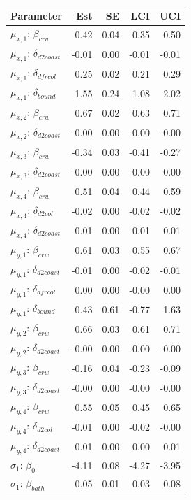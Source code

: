 \documentclass{rgclass}
\begin{document}
\begin{longtable}{@{}lrrrr@{}}
\toprule
Parameter & Est & SE & LCI & UCI \\
\bottomrule
$\mu_{x,1}$: $\beta_{crw}$ & 0.42 & 0.04 & 0.35 & 0.50 \\
$\mu_{x,1}$: $\delta_{d2coast}$ & -0.01 & 0.00 & -0.01 & -0.01 \\
$\mu_{x,1}$: $\delta_{dfrcol}$ & 0.25 & 0.02 & 0.21 & 0.29 \\
$\mu_{x,1}$: $\delta_{bound}$ & 1.55 & 0.24 & 1.08 & 2.02 \\
\hdashline
$\mu_{x,2}$: $\beta_{crw}$ & 0.67 & 0.02 & 0.63 & 0.71 \\
$\mu_{x,2}$: $\delta_{d2coast}$ & -0.00 & 0.00 & -0.00 & -0.00 \\
\hdashline
$\mu_{x,3}$: $\beta_{crw}$ & -0.34 & 0.03 & -0.41 & -0.27 \\
$\mu_{x,3}$: $\delta_{d2coast}$ & -0.00 & 0.00 & -0.00 & 0.00 \\
\hdashline
$\mu_{x,4}$: $\beta_{crw}$ & 0.51 & 0.04 & 0.44 & 0.59 \\
$\mu_{x,4}$: $\delta_{d2col}$ & -0.02 & 0.00 & -0.02 & -0.02 \\
$\mu_{x,4}$: $\delta_{d2coast}$ & 0.01 & 0.00 & 0.01 & 0.01 \\
\hdashline
$\mu_{y,1}$: $\beta_{crw}$ & 0.61 & 0.03 & 0.55 & 0.67 \\
$\mu_{y,1}$: $\delta_{d2coast}$ & -0.01 & 0.00 & -0.02 & -0.01 \\
$\mu_{y,1}$: $\delta_{dfrcol}$ & 0.00 & 0.00 & -0.00 & 0.00 \\
$\mu_{y,1}$: $\delta_{bound}$ & 0.43 & 0.61 & -0.77 & 1.63 \\
\hdashline
$\mu_{y,2}$: $\beta_{crw}$ & 0.66 & 0.03 & 0.61 & 0.71 \\
$\mu_{y,2}$: $\delta_{d2coast}$ & -0.00 & 0.00 & -0.00 & -0.00 \\
\hdashline
$\mu_{y,3}$: $\beta_{crw}$ & -0.16 & 0.04 & -0.23 & -0.09 \\
$\mu_{y,3}$: $\delta_{d2coast}$ & -0.00 & 0.00 & -0.00 & -0.00 \\
\hdashline
$\mu_{y,4}$: $\beta_{crw}$ & 0.55 & 0.05 & 0.45 & 0.65 \\
$\mu_{y,4}$: $\delta_{d2col}$ & -0.01 & 0.00 & -0.02 & -0.00 \\
$\mu_{y,4}$: $\delta_{d2coast}$ & 0.01 & 0.00 & 0.00 & 0.01 \\
\hdashline
$\sigma_{1}$: $\beta_0$ & -4.11 & 0.08 & -4.27 & -3.95 \\
$\sigma_{1}$: $\beta_{bath}$ & 0.05 & 0.01 & 0.03 & 0.08 \\

\end{longtable}
\end{document}
